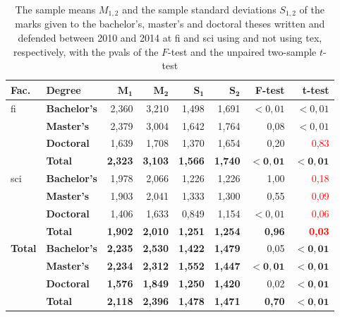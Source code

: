   \begin{table}
      \begin{tabularx}{\textwidth}{Xlrrrrrr}
        \bf Fac. & \bf Degree & $\mathbf{M_1}$ & $\mathbf{M_2}$ & $\mathbf{S_1}$ & $\mathbf{S_2}$ & \bf F-test & \bf t-test \\
      \hline
      \acrshort{fi}  %
        & \textbf{Bachelor's} & 2,360 & 3,210 & 1,498 & 1,691 & $<0{,}01$ & \textcolor{OliveGreen}{$<0{,}01$} \\
        & \textbf{Master's}   & 2,379 & 3,004 & 1,642 & 1,764 & 0,08 & \textcolor{OliveGreen}{$<0{,}01$} \\
        & \textbf{Doctoral}   & 1,639 & 1,708 & 1,370 & 1,654 & 0,20 & \textcolor{red}{0,83} \\
        & \textbf{Total}      & \bf 2,323 & \bf 3,103 \bf & \bf 1,566 & \bf 1,740 & $\mathbf{<0{,}01}$ & \textcolor{OliveGreen}{$\mathbf{<0{,}01}$}\\

      \acrshort{sci} %
        & \textbf{Bachelor's} & 1,978 & 2,066 & 1,226 & 1,226 & 1,00 & \textcolor{red}{0,18} \\
        & \textbf{Master's}   & 1,903 & 2,041 & 1,333 & 1,300 & 0,55 & \textcolor{red}{0,09} \\
        & \textbf{Doctoral}   & 1,406 & 1,633 & 0,849 & 1,154 & $<0{,}01$ & \textcolor{red}{0,06} \\

        & \textbf{Total}      & \bf 1,902 & \bf 2,010 & \bf 1,251 & \bf 1,254 & \bf 0,96 & \textcolor{red}{\bf 0,03} \\
      \hline
      \textbf{Total} 
      & \textbf{Bachelor's} & \bf 2,235 & \bf 2,530 & \bf 1,422 & \bf 1,479 & 0,05  & \textcolor{OliveGreen}{$\mathbf{<0{,}01}$} \\
      & \textbf{Master's} & \bf 2,234 & \bf 2,312 & \bf 1,552 & \bf 1,447 & $\mathbf{<0{,}01}$ & \textcolor{OliveGreen}{$\mathbf{<0{,}01}$} \\
      & \textbf{Doctoral} & \bf 1,576 & \bf 1,849 & \bf 1,250 & \bf 1,420 & 0,02 & \textcolor{OliveGreen}{$\mathbf{<0{,}01}$} \\
      & \textbf{Total}    & \bf 2,118 & \bf 2,396 & \bf 1,478 & \bf 1,471 & \bf 0,70 & \textcolor{OliveGreen}{$\mathbf{<0{,}01}$} \\
    \end{tabularx}
    \caption{The sample means $M_{1,2}$ and the sample standard deviations $S_{1,2}$ of the marks given to the bachelor's, master's and doctoral theses written and defended between 2010 and 2014 at \gls{fi} and \gls{sci} using and not using \gls{tex}, respectively, with the \glspl{pval} of the $F$-test and the unpaired two-sample $t$-test}
    \label{table:statistics-tex-marks}
  \end{table}
  
